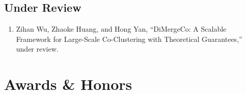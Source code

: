 \documentclass[11pt,a4paper]{moderncv}
\begin{document}
\subsection*{Under Review}
\begin{enumerate}\setlength\itemsep{2pt}
  \item Zihan Wu, Zhaoke Huang, and Hong Yan, “DiMergeCo: A Scalable Framework for Large-Scale Co-Clustering with Theoretical Guarantees,” under review.
\end{enumerate}

\section{Awards \& Honors}
\end{document}
